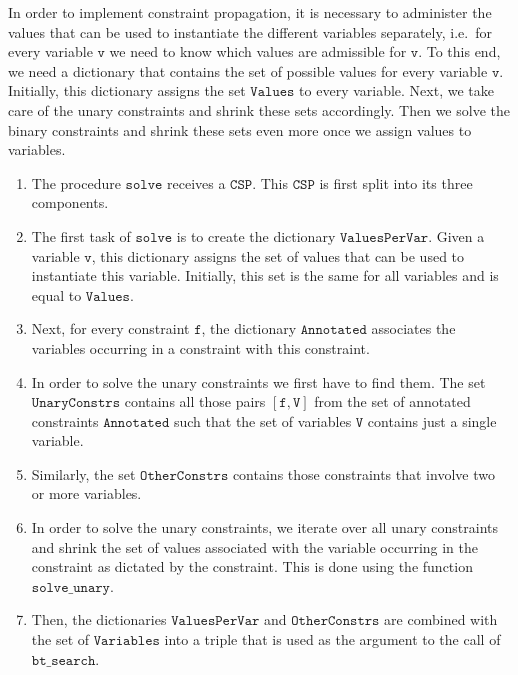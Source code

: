 In order to implement constraint propagation, it is necessary to administer the values that can be used
to instantiate the different variables separately, i.e.~for every variable $\texttt{v}$ we need to know which
values are admissible for $\texttt{v}$.  To this end, we need a dictionary that contains the set of possible
values for every variable $\texttt{v}$.  Initially, this dictionary assigns the set $\texttt{Values}$ to
every variable.  Next, we take care of the unary constraints and shrink these sets accordingly.  Then we solve
the binary constraints and shrink these sets even more once we assign values to variables.
\begin{enumerate}
\item The procedure $\texttt{solve}$ receives a $\texttt{CSP}$.  This $\texttt{CSP}$ is first split into its three components.
\item The first task of $\texttt{solve}$ is to create the dictionary $\texttt{ValuesPerVar}$.  
      Given a variable $\texttt{v}$, this dictionary assigns the set of values that can be used to instantiate this
      variable.  Initially, this set is the same for all variables and is equal to $\texttt{Values}$.
\item Next, for every constraint $\texttt{f}$, the dictionary $\texttt{Annotated}$ associates the
      variables occurring in a constraint with this constraint.
\item In order to solve the unary constraints we first have to find them.
      The set $\texttt{UnaryConstrs}$ contains all those pairs $[\texttt{f}, \texttt{V}]$ from the set of
      annotated constraints $\texttt{Annotated}$ such that the set of variables $\texttt{V}$ contains just a
      single variable. 
\item Similarly, the set $\texttt{OtherConstrs}$ contains those constraints that involve two or more variables.
\item In order to solve the unary constraints, we iterate over all unary constraints and shrink the set of
      values associated with the variable occurring in the constraint as dictated by the constraint.
      This is done using the function $\texttt{solve\_unary}$.
\item Then, the dictionaries $\texttt{ValuesPerVar}$ and $\texttt{OtherConstrs}$ are combined with the set
      of $\texttt{Variables}$ into a triple that is used as the argument to the call of $\texttt{bt\_search}$.
\end{enumerate}

